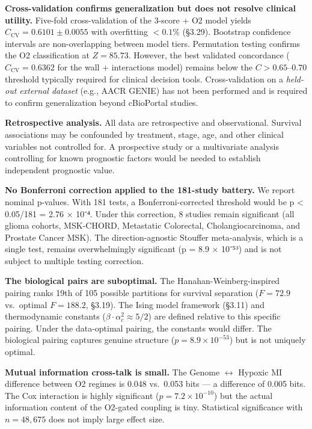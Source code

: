 \documentclass[
  11pt,
]{article}
\begin{document}
\textbf{Cross-validation confirms generalization but does not resolve
clinical utility.} Five-fold cross-validation of the 3-score + O2 model
yields \(C_\mathrm{CV} = 0.6101 \pm 0.0055\) with overfitting
\(< 0.1\%\) (§3.29). Bootstrap confidence intervals are non-overlapping
between model tiers. Permutation testing confirms the O2 classification
at \(Z = 85.73\). However, the best validated concordance
(\(C_\mathrm{CV} = 0.6362\) for the wall + interactions model) remains
below the \(C > 0.65\)--\(0.70\) threshold typically required for
clinical decision tools. Cross-validation on a \emph{held-out external
dataset} (e.g., AACR GENIE) has not been performed and is required to
confirm generalization beyond cBioPortal studies.

\textbf{Retrospective analysis.} All data are retrospective and
observational. Survival associations may be confounded by treatment,
stage, age, and other clinical variables not controlled for. A
prospective study or a multivariate analysis controlling for known
prognostic factors would be needed to establish independent prognostic
value.

\textbf{No Bonferroni correction applied to the 181-study battery.} We
report nominal p-values. With 181 tests, a Bonferroni-corrected
threshold would be p \textless{} 0.05/181 = 2.76 × 10⁻⁴. Under this
correction, 8 studies remain significant (all glioma cohorts, MSK-CHORD,
Metastatic Colorectal, Cholangiocarcinoma, and Prostate Cancer MSK). The
direction-agnostic Stouffer meta-analysis, which is a single test,
remains overwhelmingly significant (p = 8.9 × 10⁻⁵³) and is not subject
to multiple testing correction.

\textbf{The biological pairs are suboptimal.} The
Hanahan-Weinberg-inspired pairing ranks 19th of 105 possible partitions
for survival separation (\(F = 72.9\) vs.~optimal \(F = 188.2\), §3.19).
The Ising model framework (§3.11) and thermodynamic constants
(\(\beta \cdot \alpha_c^2 \approx 5/2\)) are defined relative to this
specific pairing. Under the data-optimal pairing, the constants would
differ. The biological pairing captures genuine structure
(\(p = 8.9 \times 10^{-53}\)) but is not uniquely optimal.

\textbf{Mutual information cross-talk is small.} The Genome
\(\leftrightarrow\) Hypoxic MI difference between O2 regimes is 0.048
vs.~0.053 bits --- a difference of 0.005 bits. The Cox interaction is
highly significant (\(p = 7.2 \times 10^{-10}\)) but the actual
information content of the O2-gated coupling is tiny. Statistical
significance with \(n = 48{,}675\) does not imply large effect size.
\end{document}
